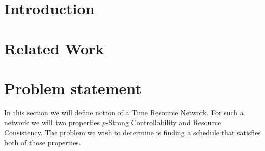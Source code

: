 \documentclass{article}
\begin{document}
\begin{multicols}{2}
\begin{abstract}
\noindent \blindtext
\end{abstract}
\section{Introduction}
\blindtext[5]

\section{Related Work}
\blindtext[5]

\section{Problem statement}
In this section we will define notion of a Time Resource Network. For such a network we will two properties $p$-Strong Controllability and Resource Consistency. The problem we wish to determine is finding a schedule that satisfies both of those properties.

\end{multicols}
\end{document}
